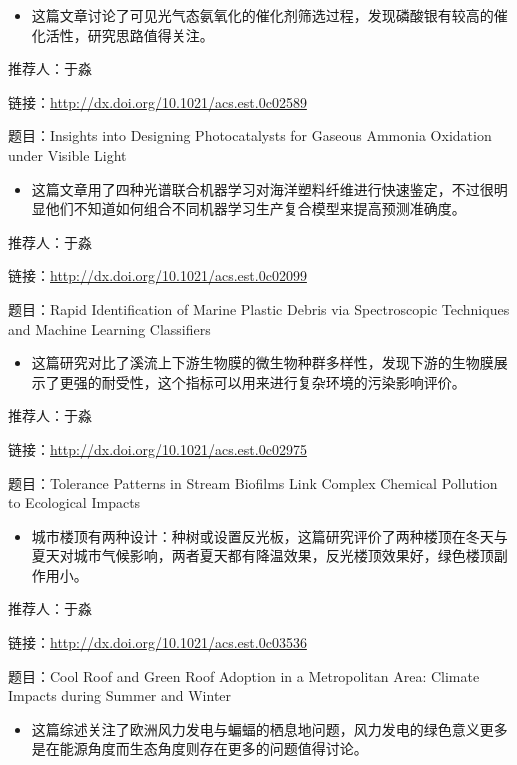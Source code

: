 \documentclass[]{book}
\providecommand{\tightlist}{%
  \setlength{\itemsep}{0pt}\setlength{\parskip}{0pt}}
\begin{document}
\begin{itemize}
\tightlist
\item
  这篇文章讨论了可见光气态氨氧化的催化剂筛选过程，发现磷酸银有较高的催化活性，研究思路值得关注。
\end{itemize}

推荐人：于淼

链接：\url{http://dx.doi.org/10.1021/acs.est.0c02589}

题目：Insights into Designing Photocatalysts for Gaseous Ammonia Oxidation under Visible Light

\begin{itemize}
\tightlist
\item
  这篇文章用了四种光谱联合机器学习对海洋塑料纤维进行快速鉴定，不过很明显他们不知道如何组合不同机器学习生产复合模型来提高预测准确度。
\end{itemize}

推荐人：于淼

链接：\url{http://dx.doi.org/10.1021/acs.est.0c02099}

题目：Rapid Identification of Marine Plastic Debris via Spectroscopic Techniques and Machine Learning Classifiers

\begin{itemize}
\tightlist
\item
  这篇研究对比了溪流上下游生物膜的微生物种群多样性，发现下游的生物膜展示了更强的耐受性，这个指标可以用来进行复杂环境的污染影响评价。
\end{itemize}

推荐人：于淼

链接：\url{http://dx.doi.org/10.1021/acs.est.0c02975}

题目：Tolerance Patterns in Stream Biofilms Link Complex Chemical Pollution to Ecological Impacts

\begin{itemize}
\tightlist
\item
  城市楼顶有两种设计：种树或设置反光板，这篇研究评价了两种楼顶在冬天与夏天对城市气候影响，两者夏天都有降温效果，反光楼顶效果好，绿色楼顶副作用小。
\end{itemize}

推荐人：于淼

链接：\url{http://dx.doi.org/10.1021/acs.est.0c03536}

题目：Cool Roof and Green Roof Adoption in a Metropolitan Area: Climate Impacts during Summer and Winter

\begin{itemize}
\tightlist
\item
  这篇综述关注了欧洲风力发电与蝙蝠的栖息地问题，风力发电的绿色意义更多是在能源角度而生态角度则存在更多的问题值得讨论。
\end{itemize}
\end{document}
